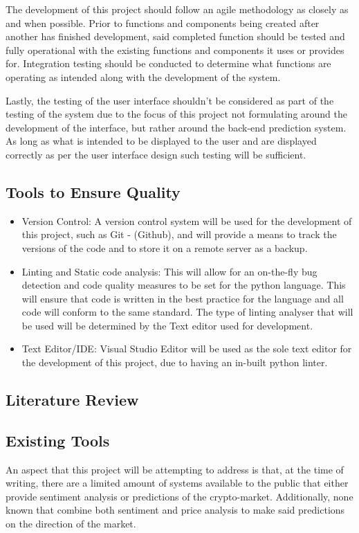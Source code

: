 \documentclass[oneside, 12pt]{article}
\begin{document}
	The development of this project should follow an agile methodology as closely as and when possible. Prior to functions and components being created after another has finished development, said completed function should be tested and fully operational with the existing functions and components it uses or provides for. Integration testing should be conducted to determine what functions are operating as intended along with the development of the system.
	
	Lastly, the testing of the user interface shouldn't be considered as part of the testing of the system due to the focus of this project not formulating around the development of the interface, but rather around the back-end prediction system. As long as what is intended to be displayed to the user and are displayed correctly as per the user interface design such testing will be sufficient.
	
	\subsection{Tools to Ensure Quality}
	
	\begin{itemize}
		\item Version Control: A version control system will be used for the development of this project, such as Git - (Github), and will provide a means to track the versions of the code and to store it on a remote server as a backup.
		\item Linting and Static code analysis: This will allow for an on-the-fly bug detection and code quality measures to be set for the python language. This will ensure that code is written in the best practice for the language and all code will conform to the same standard. The type of linting analyser that will be used will be determined by the Text editor used for development.
		\item Text Editor/IDE: Visual Studio Editor will be used as the sole text editor for the development of this project, due to having an in-built python linter.
	\end{itemize}
	
	\newpage
	
	\begin{center}
		\section{Literature Review}\label{literature}
	\end{center}
		\subsection{Existing Tools}
		An aspect that this project will be attempting to address is that, at the time of writing, there are a limited amount of systems available to the public that either provide sentiment analysis or predictions of the crypto-market. Additionally, none known that combine both sentiment and price analysis to make said predictions on the direction of the market.
		
\end{document}
